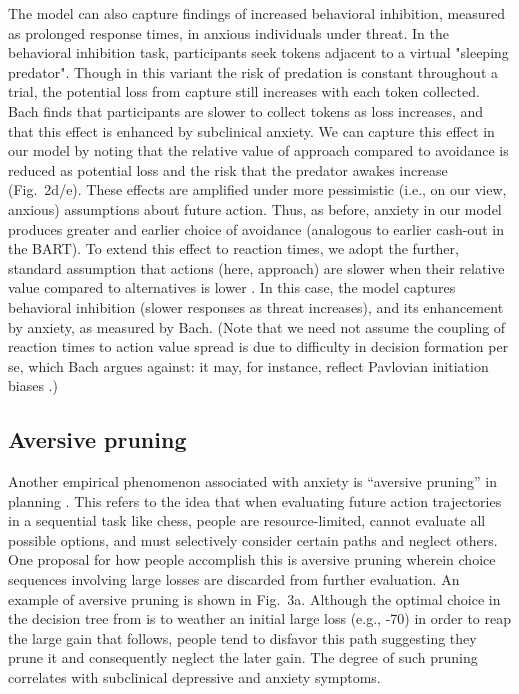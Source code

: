 \documentclass[11pt]{article} %
\begin{document}
The model can also capture findings of increased behavioral inhibition, measured as prolonged response times, in anxious individuals under threat\cite{bach2015}. In the behavioral inhibition task, participants seek tokens adjacent to a virtual "sleeping predator". Though in this variant the risk of predation is constant throughout a trial, the potential loss from capture still increases with each token collected. Bach \cite{bach2015} finds that participants are slower to collect tokens as loss increases, and that this effect is enhanced by subclinical anxiety. We can capture this effect in our model by noting that the relative value of approach compared to avoidance is reduced as potential loss and the risk that the predator awakes increase (Fig.~2d/e). These effects are amplified under more pessimistic (i.e., on our view, anxious) assumptions about future action. Thus, as before, anxiety in our model produces greater and earlier choice of avoidance (analogous to earlier cash-out in the BART). To extend this effect to reaction times, we adopt the further, standard assumption that actions (here, approach) are slower when their relative value compared to alternatives is lower \citep{oud2016}. In this case, the model captures behavioral inhibition (slower responses as threat increases), and its enhancement by anxiety, as measured by Bach. (Note that we need not assume the coupling of reaction times to action value spread is due to difficulty in decision formation per se, which Bach argues against: it may, for instance, reflect Pavlovian initiation biases \cite{niv2007}.)

\subsection{Aversive pruning} 

Another empirical phenomenon associated with anxiety is ``aversive pruning'' in planning \cite{Huys2012, Lally2017}. This refers to the idea that when evaluating future action trajectories in a sequential task like chess, people are resource-limited, cannot evaluate all possible options, and must selectively consider certain paths and neglect others. One proposal for how people accomplish this is aversive pruning \citep{Huys2012} wherein choice sequences involving large losses are discarded from further evaluation. An example of aversive pruning is shown in Fig.~3a. Although the optimal choice in the decision tree from is to weather an initial large loss (e.g., -70) in order to reap the large gain that follows, people tend to disfavor this path suggesting they prune it and consequently neglect the later gain. The degree of such pruning correlates with subclinical depressive \cite{Huys2012} and anxiety \cite{Lally2017} symptoms. 
\end{document}
